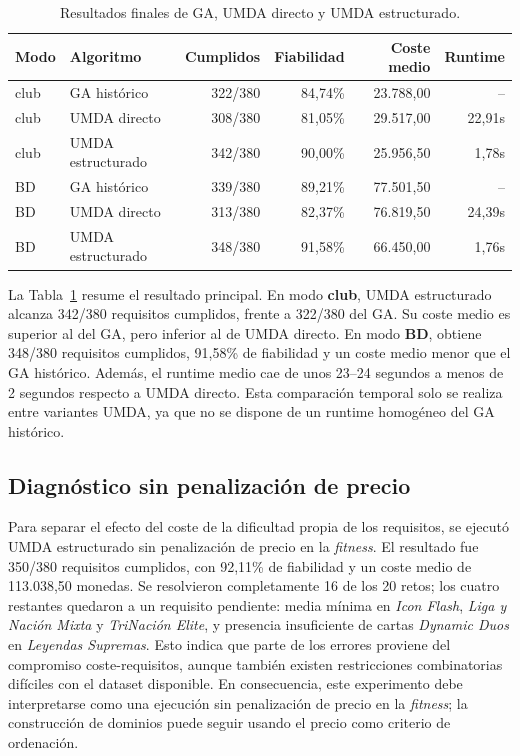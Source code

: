 \documentclass[10pt,a4paper]{article}
\begin{document}
\begin{table}[h]
\centering
\begin{tabular}{llrrrr}
\toprule
Modo & Algoritmo & Cumplidos & Fiabilidad & Coste medio & Runtime \\
\midrule
club & GA histórico & 322/380 & 84,74\% & 23.788,00 & -- \\
club & UMDA directo & 308/380 & 81,05\% & 29.517,00 & 22,91s \\
club & UMDA estructurado & 342/380 & 90,00\% & 25.956,50 & 1,78s \\
\midrule
BD & GA histórico & 339/380 & 89,21\% & 77.501,50 & -- \\
BD & UMDA directo & 313/380 & 82,37\% & 76.819,50 & 24,39s \\
BD & UMDA estructurado & 348/380 & 91,58\% & 66.450,00 & 1,76s \\
\bottomrule
\end{tabular}
\caption{Resultados finales de GA, UMDA directo y UMDA estructurado.}
\label{tab:final}
\end{table}

La Tabla~\ref{tab:final} resume el resultado principal. En modo \textbf{club}, UMDA estructurado alcanza 342/380 requisitos cumplidos, frente a 322/380 del GA. Su coste medio es superior al del GA, pero inferior al de UMDA directo. En modo \textbf{BD}, obtiene 348/380 requisitos cumplidos, 91,58\% de fiabilidad y un coste medio menor que el GA histórico. Además, el runtime medio cae de unos 23--24 segundos a menos de 2 segundos respecto a UMDA directo. Esta comparación temporal solo se realiza entre variantes UMDA, ya que no se dispone de un runtime homogéneo del GA histórico.

\subsection{Diagnóstico sin penalización de precio}

Para separar el efecto del coste de la dificultad propia de los requisitos, se ejecutó UMDA estructurado sin penalización de precio en la \textit{fitness}. El resultado fue 350/380 requisitos cumplidos, con 92,11\% de fiabilidad y un coste medio de 113.038,50 monedas. Se resolvieron completamente 16 de los 20 retos; los cuatro restantes quedaron a un requisito pendiente: media mínima en \textit{Icon Flash}, \textit{Liga y Nación Mixta} y \textit{TriNación Elite}, y presencia insuficiente de cartas \textit{Dynamic Duos} en \textit{Leyendas Supremas}. Esto indica que parte de los errores proviene del compromiso coste-requisitos, aunque también existen restricciones combinatorias difíciles con el dataset disponible. En consecuencia, este experimento debe interpretarse como una ejecución sin penalización de precio en la \textit{fitness}; la construcción de dominios puede seguir usando el precio como criterio de ordenación.
\end{document}
